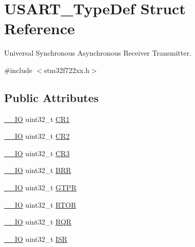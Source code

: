 \hypertarget{struct_u_s_a_r_t___type_def}{}\section{U\+S\+A\+R\+T\+\_\+\+Type\+Def Struct Reference}
\label{struct_u_s_a_r_t___type_def}


Universal Synchronous Asynchronous Receiver Transmitter.  




{\ttfamily \#include $<$stm32f722xx.\+h$>$}

\subsection*{Public Attributes}
\begin{DoxyCompactItemize}
\item 
\mbox{\hyperlink{core__sc300_8h_aec43007d9998a0a0e01faede4133d6be}{\+\_\+\+\_\+\+IO}} uint32\+\_\+t \mbox{\hyperlink{struct_u_s_a_r_t___type_def_a6d7dcd3972a162627bc3470cbf992ec4}{C\+R1}}
\item 
\mbox{\hyperlink{core__sc300_8h_aec43007d9998a0a0e01faede4133d6be}{\+\_\+\+\_\+\+IO}} uint32\+\_\+t \mbox{\hyperlink{struct_u_s_a_r_t___type_def_aa7ede2de6204c3fc4bd9fb328801c99a}{C\+R2}}
\item 
\mbox{\hyperlink{core__sc300_8h_aec43007d9998a0a0e01faede4133d6be}{\+\_\+\+\_\+\+IO}} uint32\+\_\+t \mbox{\hyperlink{struct_u_s_a_r_t___type_def_af2991da9a4e1539530cd6b7b327199cc}{C\+R3}}
\item 
\mbox{\hyperlink{core__sc300_8h_aec43007d9998a0a0e01faede4133d6be}{\+\_\+\+\_\+\+IO}} uint32\+\_\+t \mbox{\hyperlink{struct_u_s_a_r_t___type_def_a6ef06ba9d8dc2dc2a0855766369fa7c9}{B\+RR}}
\item 
\mbox{\hyperlink{core__sc300_8h_aec43007d9998a0a0e01faede4133d6be}{\+\_\+\+\_\+\+IO}} uint32\+\_\+t \mbox{\hyperlink{struct_u_s_a_r_t___type_def_ae23acff49b4ff96fd29093e80fc7d72e}{G\+T\+PR}}
\item 
\mbox{\hyperlink{core__sc300_8h_aec43007d9998a0a0e01faede4133d6be}{\+\_\+\+\_\+\+IO}} uint32\+\_\+t \mbox{\hyperlink{struct_u_s_a_r_t___type_def_a5732c379e1ce532552e80392db4eabf8}{R\+T\+OR}}
\item 
\mbox{\hyperlink{core__sc300_8h_aec43007d9998a0a0e01faede4133d6be}{\+\_\+\+\_\+\+IO}} uint32\+\_\+t \mbox{\hyperlink{struct_u_s_a_r_t___type_def_add7a9e13a3281f6bea133b3693ce68f8}{R\+QR}}
\item 
\mbox{\hyperlink{core__sc300_8h_aec43007d9998a0a0e01faede4133d6be}{\+\_\+\+\_\+\+IO}} uint32\+\_\+t \mbox{\hyperlink{struct_u_s_a_r_t___type_def_a79ce09e9fbedb2d169b3a584ed003b02}{I\+SR}}

\end{DoxyCompactItemize}
